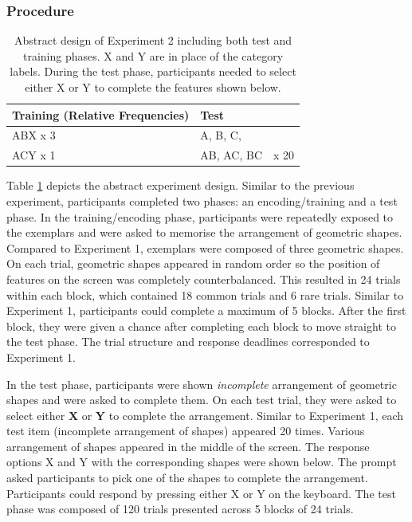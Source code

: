 \documentclass[10pt,letterpaper]{article}
\begin{document}
\subsubsection{Procedure}

\begin{table}[!ht]
  \begin{center}
    \caption{Abstract design of Experiment 2 including both test and training phases. X and Y are in place of the category labels. During the test phase, participants needed to select either X or Y to complete the features shown below.\\}
    \label{tab:abstract-exp2}
    \begin{tabular}{llr} %
      \textbf{Training (Relative Frequencies)} & \textbf{Test}& \\
      \hline
      ABX x 3 &  A, B, C,        & \\
      ACY x 1 &  AB, AC, BC      & x 20 \\
      \hline
    \end{tabular}
  \end{center}
\end{table}

Table \ref*{tab:abstract-exp2} depicts the abstract experiment design.
Similar to the previous experiment, participants completed two phases: an encoding/training and a test phase.
In the training/encoding phase, participants were repeatedly exposed to the exemplars and were asked to memorise the arrangement of geometric shapes.
Compared to Experiment 1, exemplars were composed of three geometric shapes.
On each trial, geometric shapes appeared in random order so the position of features on the screen was completely counterbalanced.
This resulted in 24 trials within each block, which contained 18 common trials and 6 rare trials.
Similar to Experiment 1, participants could complete a maximum of 5 blocks.
After the first block, they were given a chance after completing each block to move straight to the test phase.
The trial structure and response deadlines corresponded to Experiment 1.

In the test phase, participants were shown \textit{incomplete} arrangement of geometric shapes and were asked to complete them.
On each test trial, they were asked to select either \textbf{X} or \textbf{Y} to complete the arrangement.
Similar to Experiment 1, each test item (incomplete arrangement of shapes) appeared 20 times.
Various arrangement of shapes appeared in the middle of the screen.
The response options X and Y with the corresponding shapes were shown below.
The prompt asked participants to pick one of the shapes to complete the arrangement.
Participants could respond by pressing either X or Y on the keyboard.
The test phase was composed of 120 trials presented across 5 blocks of 24 trials.
\\
\end{document}
